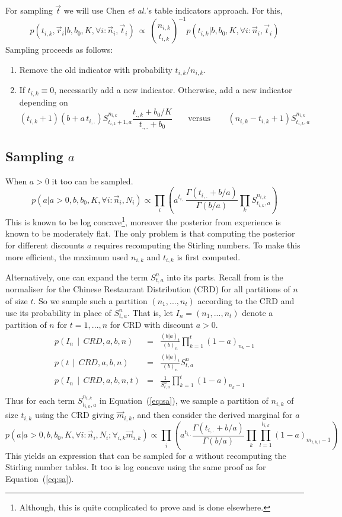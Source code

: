 \documentclass{article}
\begin{document}
For sampling $\vec{t}$ we will use Chen {\it et al.}'s table indicators
approach.
For this,
\[
p\left(t_{i,k},\vec{r}_{i} |
 b ,b_0,K,\forall i : \vec{n}_i, \vec{t}_i\right) ~\propto~
{n_{i,k} \choose t_{i,k}}^{-1}
p\left(t_{i,k} | b ,b_0,K,\forall i : \vec{n}_i, \vec{t}_i\right)
\]
Sampling proceeds as follows:
\begin{enumerate}
\item
Remove the old indicator
with probability $t_{i,k}/n_{i,k}$.
\item
If $t_{i,k}\equiv 0$, necessarily add a new indicator.
Otherwise, add a new indicator depending on
\[
(t_{i,k}+1) (b+a\,t_{i,.}) S^{n_{i,k}}_{t_{i,k}+1,a} 
\frac{t_{.,k}+b_0/K}{t_{.,.}+b_0}
~~~~~~~\mbox{ versus }~~~~~~~~ (n_{i,k}-t_{i,k}+1)S^{n_{i,k}}_{t_{i,k},a} 
\]
\end{enumerate}

\subsection{Sampling $a$}
When $a>0$ it too can be sampled.
\begin{equation}\label{eq:sa}
p(a |a>0, b, b_0,K,\forall i : \vec{n}_i, N_i)
\propto
\prod_i \left( a^{t_{i,.}}
\frac{\Gamma(t_{i,.}+b/a)}{\Gamma(b/a)} 
               \prod_k S^{n_{i,k}}_{t_{i,k},a} \right)
\end{equation}
This is known to be log concave\footnote{Although, this is
quite complicated to prove and is done elsewhere.},
moreover the posterior from experience is known to be moderately
flat.
The only problem is that computing the posterior for different
discounts $a$ requires recomputing the Stirling numbers.
To make this more efficient, the maximum used
$n_{i,k}$ and $t_{i,k}$ is first computed.

Alternatively, one can expand the term $S^n_{t,a}$ into its
parts.  Recall from \cite{Bun12} is the normaliser for the
Chinese Restaurant Distribution (CRD) for all partitions of $n$
of size $t$.  So we sample such a partition $(n_1,...,n_t)$
according to the CRD and use its probability in place of
$S^n_{t,a}$.
That is, let $I_n=(n_1,...,n_t)$ denote a partition of $n$
for $t=1,...,n$ for CRD with discount $a>0$.
\begin{eqnarray*}
p(I_n\,\mid\, CRD,a,b,n) &=&\frac{(b|a)_t}{(b)_n} \prod_{k=1}^t (1-a)_{n_k-1} \\
p(t\,\mid\, CRD,a,b,n) &=& \frac{(b|a)_t}{(b)_n} S^n_{t,a}\\
p(I_n\,\mid\, CRD,a,b,n,t) &=& \frac{1}{S^n_{t,a}} \prod_{k=1}^t (1-a)_{n_k-1} \\
\end{eqnarray*}
Thus for each term $S^{n_{i,k}}_{t_{i,k},a}$ in Equation~(\ref{eq:sa}), we sample
a partition of $n_{i,k}$ of size $t_{i,k}$ using the CRD
giving $\vec{m}_{i,k}$, and then consider the derived marginal for $a$
\[
p\left(a |
a>0, b, b_0,K,\forall i : \vec{n}_i, N_i; \forall_{i,k} \vec{m}_{i,k}\right)
\propto
\prod_i \left( a^{t_{i,.}} \frac{\Gamma(t_{i,.}+b/a)}{\Gamma(b/a)} 
               \prod_k \prod_{l=1}^{t_{i,k}} (1-a)_{m_{i,k,l}-1} \right)
\]
This yields an expression that can be sampled for $a$ without recomputing
the Stirling number tables.  It too is log concave using the
same proof as for Equation~(\ref{eq:sa}).
\end{document}
